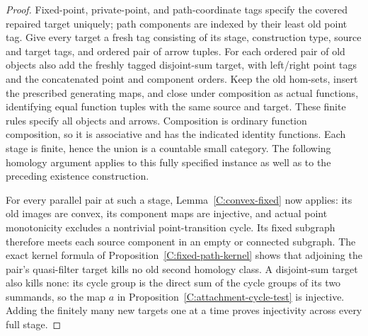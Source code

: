 \begin{proof}
Fixed-point, private-point, and path-coordinate tags specify the
covered repaired target uniquely; path components are indexed by
their least old point tag. Give every target a fresh tag consisting
of its stage, construction type, source and target tags, and ordered
pair of arrow tuples. For each ordered pair of old objects also add
the freshly tagged disjoint-sum target, with left/right point tags
and the concatenated point and component orders. Keep the old
hom-sets, insert the prescribed generating maps, and close under
composition as actual functions, identifying equal function tuples
with the same source and target. These finite rules specify all
objects and arrows. Composition is ordinary function composition,
so it is associative and has the indicated identity functions.
Each stage is finite, hence the union is a countable small category.
The following homology argument applies to this fully specified
instance as well as to the preceding existence construction.

For every parallel pair at such a stage,
Lemma~\ref{C:convex-fixed} now applies: its old images are convex,
its component maps are injective, and actual point monotonicity
excludes a nontrivial point-transition cycle. Its fixed subgraph therefore meets each
source component in an empty or connected subgraph. The exact
kernel formula of Proposition~\ref{C:fixed-path-kernel} shows that
adjoining the pair's quasi-filter target kills no old second
homology class. A disjoint-sum target also kills none: its cycle
group is the direct sum of the cycle groups of its two summands,
so the map $a$ in Proposition~\ref{C:attachment-cycle-test} is
injective. Adding the finitely many new targets one at a time
proves injectivity across every full stage.


\end{proof}
